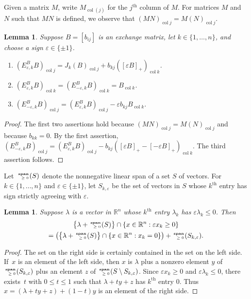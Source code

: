 \documentclass{amsart}
\newtheorem{lemma}[proposition]{Lemma}
\theoremstyle{definition}
\theoremstyle{remark}
\numberwithin{equation}{section}
\newcommand{\reals}{\mathbb R}
\newcommand{\ep}{\varepsilon}
\newcommand{\col}{\operatorname{col}}
\newcommand{\sgn}{\operatorname{sgn}}
\newcommand{\nnspan}{{\!\!\tiny\begin{array}{r}\mathbf{span}\\\ge0\end{array}\hspace*{-0.57em}}}
\newcommand{\set}[1]{{\lbrace #1 \rbrace}}
\newcommand{\sett}[1]{{\bigl\lbrace #1 \bigr\rbrace}}
\renewcommand{\th}{^\text{th}}
\newcommand{\0}{{\mathbf{0}}}
\renewcommand{\th}{^\text{th}}
\begin{document}
Given a matrix $M$, write $M_{\col(j)}$ for the $j\th$ column of $M$.
For matrices $M$ and~$N$ such that $MN$ is defined, we observe that $(MN)_{\col j}=M(N)_{\col j}$.
\begin{lemma}\label{columns lem}
Suppose $B=[b_{ij}]$ is an exchange matrix, let $k\in\set{1,\ldots,n}$, and choose a sign $\ep\in\set{\pm1}$.
\begin{enumerate}[\quad\bf1.]
\item \label{col j}
$(E_{\ep,k}^BB)_{\col j}=J_k(B)_{\col j}+b_{kj}([\ep B]_+)_{\col k}$.
\item \label{col k}
$(E_{\ep,k}^BB)_{\col k}=(E_{-\ep,k}^BB)_{\col k}=B_{\col k}$.
\item \label{cols k}
$(E_{-\ep,k}^BB)_{\col j}=(E_{\ep,k}^BB)_{\col j}-\ep b_{kj}B_{\col k}$.
\end{enumerate}
\end{lemma}
\begin{proof}
The first two assertions hold because $(MN)_{\col j}=M(N)_{\col j}$ and because $b_{kk}=0$.
By the first assertion, $(E_{-\ep,k}^BB)_{\col j}=(E_{\ep,k}^BB)_{\col j}-b_{kj}([\ep B]_+-[-\ep B]_+)_{\col k}$.  
The third assertion follows.
\end{proof}

Let~$\nnspan(S)$ denote the nonnegative linear span of a set $S$ of vectors.
For ${k\in\set{1,\ldots,n}}$ and $\ep\in\set{\pm1}$, let $S_{k,\ep}$ be the set of vectors in $S$ whose $k\th$ entry has sign strictly agreeing with $\ep$.

\begin{lemma}\label{ps lemma}
Suppose $\lambda$ is a vector in $\reals^n$ whose $k\th$ entry $\lambda_k$ has $\ep\lambda_k\le0$.
Then %
\begin{multline*}
\sett{\lambda+\nnspan(S)}\cap\set{x\in\reals^n:\ep x_k\ge0}\\
=\bigl(\sett{\lambda+\nnspan(S)}\cap\set{x\in\reals^n:x_k=0}\bigr)+\nnspan(S_{k,\ep}).
\end{multline*}
\end{lemma}
\begin{proof}
The set on the right side is certainly contained in the set on the left side.
If~$x$ is an element of the left side, then $x$ is $\lambda$ plus a nonzero element $y$ of $\nnspan(S_{k,\ep})$ plus an element $z$ of $\nnspan(S\setminus S_{k,\ep})$.
Since $\ep x_k\ge0$ and $\ep\lambda_k\le0$, there exists~$t$ with ${0\le t\le1}$ such that $\lambda+ty+z$ has $k\th$ entry $0$.
Thus ${x=(\lambda+ty+z)+(1-t)y}$ is an element of the right side.
\end{proof}
\end{document}
